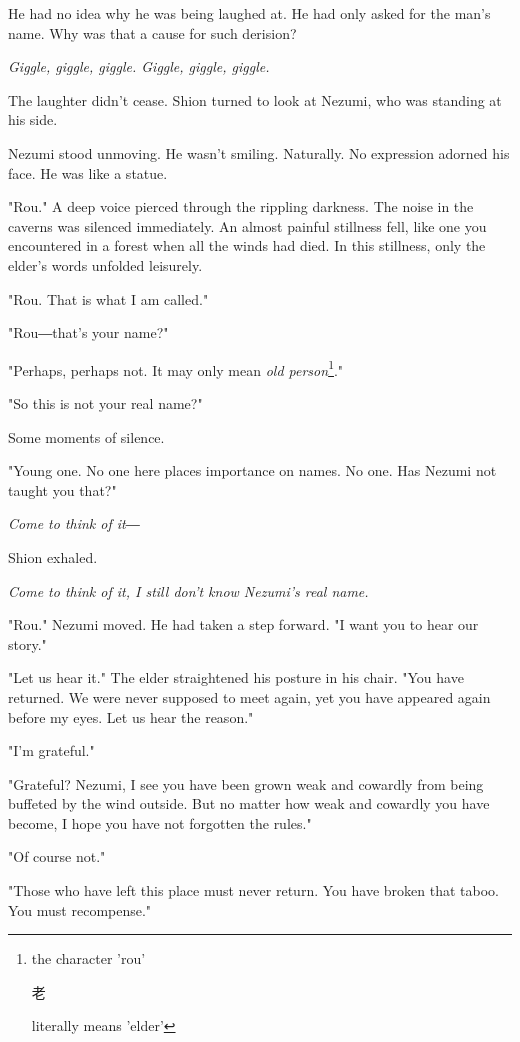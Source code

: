 He had no idea why he was being laughed at. He had only asked for the
man's name. Why was that a cause for such derision?

\emph{Giggle, giggle, giggle. Giggle, giggle, giggle.}

The laughter didn't cease. Shion turned to look at Nezumi, who was
standing at his side.

Nezumi stood unmoving. He wasn't smiling. Naturally. No expression
adorned his face. He was like a statue.

"Rou." A deep voice pierced through the rippling darkness. The noise in
the caverns was silenced immediately. An almost painful stillness fell,
like one you encountered in a forest when all the winds had died. In
this stillness, only the elder's words unfolded leisurely.

"Rou. That is what I am called."

"Rou―that's your name?"

"Perhaps, perhaps not. It may only mean \emph{old person}\footnote{the character 'rou' \begin{CJK}{UTF8}{min}老\end{CJK} literally means 'elder'}."

"So this is not your real name?"

Some moments of silence.

"Young one. No one here places importance on names. No one. Has Nezumi
not taught you that?"

\emph{Come to think of it―}

Shion exhaled.

\emph{Come to think of it, I still don't know Nezumi's real name.}

"Rou." Nezumi moved. He had taken a step forward. "I want you to hear
our story."

"Let us hear it." The elder straightened his posture in his chair. "You
have returned. We were never supposed to meet again, yet you have
appeared again before my eyes. Let us hear the reason."

"I'm grateful."

"Grateful? Nezumi, I see you have been grown weak and cowardly from
being buffeted by the wind outside. But no matter how weak and cowardly
you have become, I hope you have not forgotten the rules."

"Of course not."

"Those who have left this place must never return. You have broken that
taboo. You must recompense."

